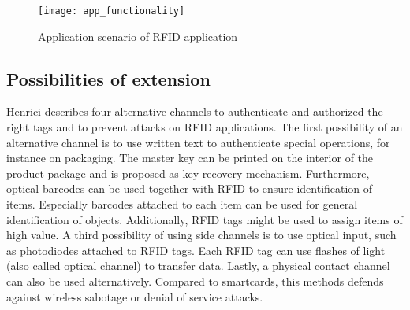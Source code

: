 \begin{figure}
\centering
\texttt{[image: app\_functionality]} 
\caption{\label{fig:appfunctionality} Application scenario of RFID application} 
\end{figure}

\subsection{Possibilities of extension}

Henrici \cite[p.121 ff.]{henrici} describes four alternative channels to authenticate and authorized the right tags and to prevent attacks on RFID applications. 
The first possibility of an alternative channel is to use written text to authenticate special operations, for instance on packaging. The master key can be printed on the interior of the product package and is proposed as key recovery mechanism.
Furthermore, optical barcodes can be used together with RFID to ensure identification of items. Especially barcodes attached to each item can be used for general identification of objects. Additionally, RFID tags might be used to assign items of high value.
A third possibility of using side channels is to use optical input, such as photodiodes attached to RFID tags. Each RFID tag can use flashes of light (also called optical channel) to transfer data.   
Lastly, a physical contact channel can also be used alternatively. Compared to smartcards, this methods defends against wireless sabotage or denial of service attacks.


















 
